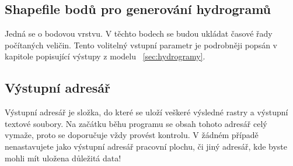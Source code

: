 












\subsection{Shapefile bodů pro generování hydrogramů} \label{sec:vstupbody}

Jedná  se o bodovou vrstvu. V těchto bodech se budou ukládat časové řady počítaných veličin. Tento volitelný vstupní parametr je podrobněji popsán v kapitole popisující výstupy z modelu~ \ref{sec:hydrogramy}.











\subsection{Výstupní adresář} \label{sec:vstupadresar}
Výstupní adresář je složka, do které se uloží veškeré výsledné rastry a výstupní textové soubory. Na začátku běhu programu se obsah tohoto adresář celý vymaže, proto se doporučuje vždy provést kontrolu. V žádném případě nenastavujete jako výstupní adresář pracovní plochu, či jiný adresář, kde byste mohli mít uložena důležitá data!











